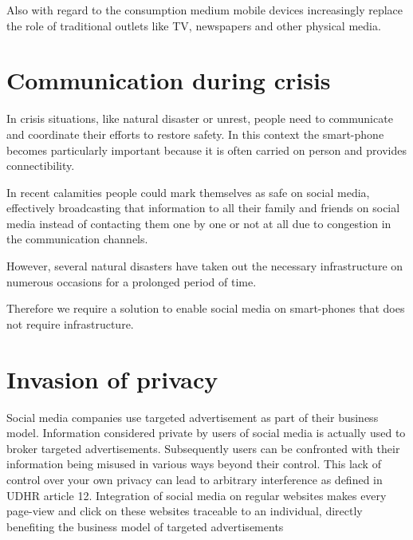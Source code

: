 Also with regard to the consumption medium mobile devices increasingly replace the role of traditional outlets like TV, newspapers and other physical media.


\section{Communication during crisis}
In crisis situations, like natural disaster or unrest, people need to communicate and coordinate their efforts to restore safety.
In this context the smart-phone becomes particularly important because it is often carried on person and provides connectibility.

In recent calamities people could mark themselves as safe on social media, effectively broadcasting that information to all their family and friends on social media instead of contacting them one by one or not at all due to congestion in the communication channels.

However, several natural disasters have taken out the necessary infrastructure on numerous occasions for a prolonged period of time. %

Therefore we require a solution to enable social media on smart-phones that does not require infrastructure. %


\section{Invasion of privacy}
Social media companies use targeted advertisement as part of their business model.
Information considered private by users of social media is actually used to broker targeted advertisements.
Subsequently users can be confronted with their information being misused in various ways beyond their control.
This lack of control over your own privacy can lead to arbitrary interference as defined in UDHR article 12. %
Integration of social media on regular websites makes every page-view and click on these websites traceable to an individual, directly benefiting the business model of targeted advertisements


